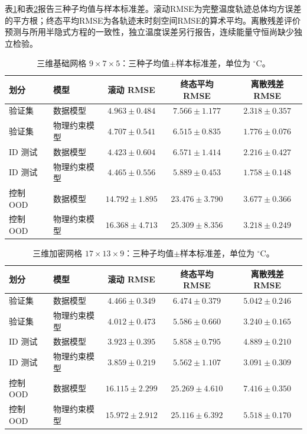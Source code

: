 
表\ref{tab:three-dimensional-zoh-base}和表\ref{tab:three-dimensional-zoh-refined}报告三种子均值与样本标准差。滚动RMSE为完整温度轨迹总体均方误差的平方根；终态平均RMSE为各轨迹末时刻空间RMSE的算术平均。离散残差评价预测与所用半隐式方程的一致性，独立温度误差另行报告，连续能量守恒尚缺少独立检验。

\begin{table}[H]
\centering
\small
\setlength{\tabcolsep}{4pt}
\caption{三维基础网格 $9\times7\times5$：三种子均值$\pm$样本标准差，单位为 $^\circ\mathrm{C}$。}
\label{tab:three-dimensional-zoh-base}
\begin{tabular}{llccc}
\toprule
划分 & 模型 & 滚动 RMSE & 终态平均 RMSE & 离散残差 RMSE \\
\midrule
验证集 & 数据模型 & $4.963\pm0.484$ & $7.566\pm1.177$ & $2.318\pm0.357$ \\
验证集 & 物理约束模型 & $4.707\pm0.541$ & $6.515\pm0.835$ & $1.776\pm0.076$ \\
ID 测试 & 数据模型 & $4.423\pm0.604$ & $6.571\pm1.414$ & $2.216\pm0.427$ \\
ID 测试 & 物理约束模型 & $4.465\pm0.556$ & $5.889\pm0.453$ & $1.758\pm0.148$ \\
控制 OOD & 数据模型 & $14.792\pm1.895$ & $23.476\pm3.790$ & $3.677\pm0.366$ \\
控制 OOD & 物理约束模型 & $16.368\pm4.713$ & $25.309\pm8.356$ & $3.218\pm0.249$ \\
\bottomrule
\end{tabular}
\end{table}

\begin{table}[H]
\centering
\small
\setlength{\tabcolsep}{4pt}
\caption{三维加密网格 $17\times13\times9$：三种子均值$\pm$样本标准差，单位为 $^\circ\mathrm{C}$。}
\label{tab:three-dimensional-zoh-refined}
\begin{tabular}{llccc}
\toprule
划分 & 模型 & 滚动 RMSE & 终态平均 RMSE & 离散残差 RMSE \\
\midrule
验证集 & 数据模型 & $4.466\pm0.349$ & $6.474\pm0.379$ & $5.042\pm0.246$ \\
验证集 & 物理约束模型 & $4.012\pm0.473$ & $5.586\pm0.660$ & $3.240\pm0.165$ \\
ID 测试 & 数据模型 & $3.923\pm0.395$ & $5.858\pm0.795$ & $4.889\pm0.210$ \\
ID 测试 & 物理约束模型 & $3.859\pm0.219$ & $5.562\pm1.107$ & $3.091\pm0.309$ \\
控制 OOD & 数据模型 & $16.115\pm2.299$ & $25.269\pm4.610$ & $7.416\pm0.350$ \\
控制 OOD & 物理约束模型 & $15.972\pm2.912$ & $25.116\pm6.392$ & $5.518\pm0.170$ \\
\bottomrule
\end{tabular}
\end{table}

